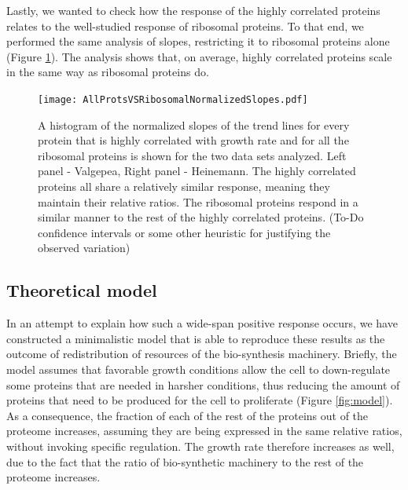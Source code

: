 \documentclass[notitlepage]{article}
\begin{document}
Lastly, we wanted to check how the response of the highly correlated proteins relates to the well-studied response of ribosomal proteins.
To that end, we performed the same analysis of slopes, restricting it to ribosomal proteins alone (Figure \ref{fig:globalfit}).
The analysis shows that, on average, highly correlated proteins scale in the same way as ribosomal proteins do.

\begin{figure}[h]
\centering
\texttt{[image: AllProtsVSRibosomalNormalizedSlopes.pdf]}
\caption{
    A histogram of the normalized slopes of the trend lines for every protein that is highly correlated with growth rate and for all the ribosomal proteins is shown for the two data sets analyzed.
    Left panel - Valgepea, Right panel - Heinemann.
    The highly correlated proteins all share a relatively similar response, meaning they maintain their relative ratios.
    The ribosomal proteins respond in a similar manner to the rest of the highly correlated proteins.
    (To-Do confidence intervals or some other heuristic for justifying the observed variation)
}
\label{fig:globalfit}
\end{figure}

\subsection{Theoretical model}
In an attempt to explain how such a wide-span positive response occurs, we have constructed a minimalistic model that is able to reproduce these results as the outcome of redistribution of resources of the bio-synthesis machinery.
Briefly, the model assumes that favorable growth conditions allow the cell to down-regulate some proteins that are needed in harsher conditions, thus reducing the amount of proteins that need to be produced for the cell to proliferate (Figure \ref{fig:model}).
As a consequence, the fraction of each of the rest of the proteins out of the proteome increases, assuming they are being expressed in the same relative ratios, without invoking specific regulation.
The growth rate therefore increases as well, due to the fact that the ratio of bio-synthetic machinery to the rest of the proteome increases.
\end{document}
